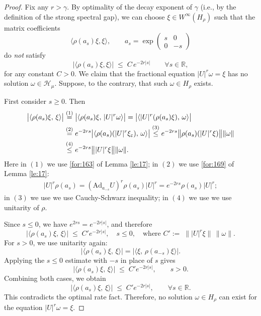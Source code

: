 \documentclass[11 pt]{amsart}
\theoremstyle{definition}
\numberwithin{equation}{section}
\begin{document}
\begin{proof} Fix any $r>\gamma$. By optimality of the decay exponent of $\gamma$ (i.e., by the
definition of the strong spectral gap), we can choose
$\xi\in W^\infty(H_\rho)$ such that the matrix coefficients
\[
\langle \rho(a_s)\xi,\xi\rangle,\qquad a_s=\exp\begin{pmatrix} s & 0 \\[5pt]
0 & -s \end{pmatrix}
\]
do \emph{not} satisfy
\[
\big|\langle \rho(a_s)\xi,\xi\rangle\big|
\;\le\; C\,e^{-2r|s|}\qquad \forall s\in\mathbb{R},
\]
for any constant $C>0$. We claim that the fractional equation $|U|^{r}\omega=\xi$ has no solution $\omega\in \mathcal{H}_{\mu}$. Suppose, to the contrary, that such
$\omega\in H_\rho$ exists.

First consider $s\geq0$. Then
\begin{align*}
 \big|\langle \rho(a_s)\xi,\, \xi\rangle \big|&\overset{\text{(1)}}{=}\big|\langle \rho(a_s)\xi,\, |U|^{r}\omega\rangle \big|=\big|\langle |U|^{r}(\rho(a_s)\xi),\, \omega\rangle \big|\notag\\
 &\overset{\text{(2)}}{=}e^{-2rs}\big|\langle \rho(a_s)(|U|^{r}\xi_\varepsilon),\, \omega\rangle \big|\overset{\text{(3)}}{\leq} e^{-2rs} \big\|\rho(a_s)(|U|^{r} \xi)\big\|\| \omega \|\notag\\
 &\overset{\text{(4)}}{\leq} e^{-2rs}  \big\||U|^{r} \xi\big\|\| \omega \|.
\end{align*}
Here in $(1)$ we use \eqref{for:163} of Lemma \ref{le:17}; in $(2)$ we use \eqref{for:169}  of Lemma \ref{le:17}:
\begin{align*}
 |U|^{r}\rho(a_s)=(\text{Ad}_{a_{-s}}U)^{r}\rho(a_s)|U|^{r}=e^{-2rs}\rho(a_s)|U|^{r};
\end{align*}
in $(3)$ we use we use Cauchy-Schwarz inequality; in $(4)$ we use we use unitarity of $\rho$.


Since $s\le 0$, we have $e^{2rs}=e^{-2r|s|}$, and therefore
\[
 \big|\langle \rho(a_s)\xi,\, \xi\rangle \big|
 \;\le\; C' e^{-2r|s|},\quad s\le 0,\quad\text{where } C':=\; \big\||U|^{r} \xi\big\|\,\| \omega \|.
\]
For $s>0$, we use unitarity again:
\[
 \big|\langle \rho(a_s)\xi,\,\xi\rangle\big|
 =\big|\langle \xi,\,\rho(a_{-s})\xi\rangle\big|.
\]
Applying the $s\le 0$ estimate with $-s$ in place of $s$ gives
\[
 \big|\langle \rho(a_s)\xi,\,\xi\rangle\big|
 \;\le\; C' e^{-2r|s|},\qquad s>0.
\]
Combining both cases, we obtain
\[
 \big|\langle \rho(a_s)\xi,\,\xi\rangle\big|
 \;\le\; C' e^{-2r|s|},\qquad \forall s\in\mathbb{R}.
\]
This contradicts the optimal rate fact. Therefore, no solution $\omega\in H_\rho$ can exist for the equation
$|U|^r\omega=\xi$.


\end{proof}
\end{document}
